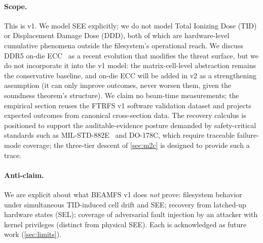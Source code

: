 \paragraph{Scope.}
This is v1. We model SEE explicitly; we do not model Total Ionizing
Dose (TID) or Displacement Damage Dose (DDD), both of which are
hardware-level cumulative phenomena outside the filesystem's
operational reach. We discuss DDR5 on-die ECC~\cite{jedec79-5} as a
recent evolution that modifies the threat surface, but we do not
incorporate it into the v1 model: the matrix-cell-level abstraction
remains the conservative baseline, and on-die ECC will be added in v2
as a strengthening assumption (it can only improve outcomes, never
worsen them, given the soundness theorem's structure). We claim no
beam-time measurements; the empirical section reuses the FTRFS v1
software validation dataset and projects expected outcomes from
canonical cross-section data. The recovery calculus is positioned
to support the auditable-evidence posture demanded by safety-critical
standards such as MIL-STD-882E~\cite{milstd882e} and DO-178C, which
require traceable failure-mode coverage; the three-tier descent of
\cref{sec:m2c} is designed to provide such a trace.

\paragraph{Anti-claim.}
We are explicit about what BEAMFS v1 does \emph{not} prove:
filesystem behavior under simultaneous TID-induced cell drift and
SEE; recovery from latched-up hardware states (SEL); coverage of
adversarial fault injection by an attacker with kernel privileges
(distinct from physical SEE). Each is acknowledged as future work
(\cref{sec:limits}).
